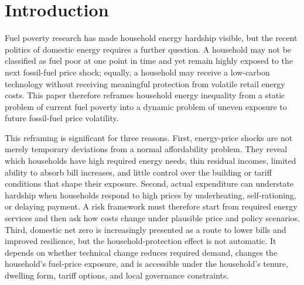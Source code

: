 \section{Introduction}

Fuel poverty research has made household energy hardship visible, but the recent politics of domestic energy requires a further question. A household may not be classified as fuel poor at one point in time and yet remain highly exposed to the next fossil-fuel price shock; equally, a household may receive a low-carbon technology without receiving meaningful protection from volatile retail energy costs. This paper therefore reframes household energy inequality from a static problem of current fuel poverty into a dynamic problem of uneven exposure to future fossil-fuel price volatility.

This reframing is significant for three reasons. First, energy-price shocks are not merely temporary deviations from a normal affordability problem. They reveal which households have high required energy needs, thin residual incomes, limited ability to absorb bill increases, and little control over the building or tariff conditions that shape their exposure. Second, actual expenditure can understate hardship when households respond to high prices by underheating, self-rationing, or delaying payment. A risk framework must therefore start from required energy services and then ask how costs change under plausible price and policy scenarios. Third, domestic net zero is increasingly presented as a route to lower bills and improved resilience, but the household-protection effect is not automatic. It depends on whether technical change reduces required demand, changes the household's fuel-price exposure, and is accessible under the household's tenure, dwelling form, tariff options, and local governance constraints.

